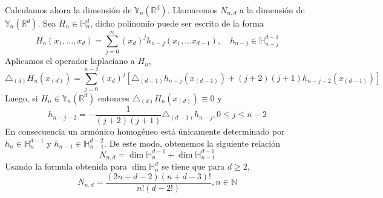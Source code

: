 Calculamos ahora la dimensión de $\mathds{Y}_n(\mathds{R}^d)$. Llamaremos $N_{n,d}$ a la dimensión de $\mathds{Y}_n(\mathds{R}^d)$.
Sea $H_{n}\in\mathds{H}_n^d$, dicho polinomio puede ser escrito de la forma
$$
H_n(x_1,...,x_d) = \sum_{j=0}^{n}(x_d)^jh_{n-j}(x_1,...x_{d-1}),\quad		h_{n-j}\in\mathds{H}_{n-j}^{d-1}
$$
Aplicamos el operador laplaciano a $H_n$,
$$
\triangle_{(d)}H_n(x_{(d)}) = \sum_{j=0}^{n-2}(x_d)^j[\triangle_{(d-1)}h_{n-j}(x_{(d-1)})+(j+2)(j+1)h_{n-j-2}(x_{(d-1)})]
$$
Luego, si $H_n \in \mathds{Y}_n(\mathds{R}^d) $ entonces $\triangle_{(d)}H_n(x_{(d)}) \equiv 0$ y
$$
h_{n-j-2} = -\frac{1}{(j+2)(j+1)}\triangle_{(d-1)}h_{n-j},		0 \le j \le n-2
$$
En consecuencia un armónico homogéneo está únicamente determinado por $h_n \in \mathds{H}_n^{d-1}$ y $h_{n-1} \in \mathds{H}_{n-1}^{d-2}$. De este modo, obtenemos la siguiente relación
$$
N_{n,d} = \dim \mathds{H}_n^{d-1}+ \dim \mathds{H}_{n-1}^{d-1}
$$
Usando la formula obtenida para $\dim \mathds{H}_n^d$ se tiene que para $d\ge 2$,
$$
N_{n,d} = \frac{(2n+d-2)(n+d-3)!}{n!(d-2!)},	n\in\mathds{N}
$$
